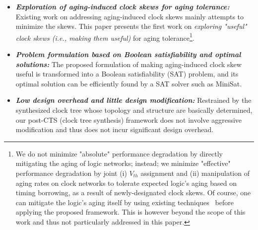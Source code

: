 \begin{itemize}
\item \textbf{\textit{Exploration of aging-induced clock skews for aging tolerance:}} Existing work on addressing aging-induced clock skews mainly attempts to minimize the skews. This paper presents the first work on \textit{exploring "useful" clock skews (i.e., making them useful)} for aging tolerance\footnote[1]{We do not minimize "absolute" performance degradation by directly mitigating the aging of logic networks; instead; we minimize "effective" performance degradation by joint (i) $V_{th}$ assignment and (ii) manipulation of aging rates on clock networks to tolerate expected logic's aging based on timing borrowing, as a result of newly-designated clock skews. Of course, one can mitigate the logic's aging itself by using existing techniques~\cite{kumar2007nbti, paul2006temporal, wang2007efficient, yang2007combating} before applying the proposed framework. This is however beyond the scope of this work and thus not particularly addressed in this paper.}.
\item  \textbf{\textit{Problem formulation based on Boolean satisfiability and optimal solutions:}} The proposed formulation of making aging-induced clock skew useful is transformed into a Boolean satisfiability (SAT) problem, and its optimal solution can be efficiently found by a SAT solver such as MiniSat.
\item \textbf{\textit{Low design overhead and little design modification:}} Restrained by the synthesized clock tree whose topology and structure are basically determined, our post-CTS (clock tree synthesis) framework does not involve aggressive modification and thus does not incur significant design overhead.
\end{itemize}




